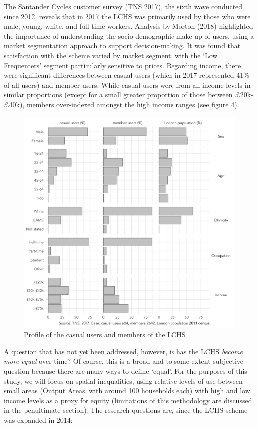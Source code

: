 \documentclass[
]{article}
\begin{document}
The Santander Cycles customer survey (TNS 2017), the sixth wave conducted since 2012, reveals that in 2017 the LCHS was primarily used by those who were male, young, white, and full-time workers.
Analysis by Morton (2018) highlighted the importance of understanding the socio-demographic make-up of users, using a market segmentation approach to support decision-making.
It was found that satisfaction with the scheme varied by market segment, with the `Low Frequenters' segment particularly sensitive to prices.
Regarding income, there were significant differences between casual users (which in 2017 represented 41\% of all users) and member users. While casual users were from all income levels in similar proportions (except for a small greater proportion of those between £20k-£40k), members over-indexed amongst the high income ranges (see figure 4).

\begin{figure}

{\centering \includegraphics[width=0.7\linewidth]{figures/profile_users_lchs} 

}

\caption{Profile of the casual users and members of the LCHS}\label{fig:profile-users-lchs}
\end{figure}

A question that has not yet been addressed, however, is has the LCHS \emph{become more equal} over time?
Of course, this is a broad and to some extent subjective question because there are many ways to define `equal'.
For the purposes of this study, we will focus on spatial inequalities, using relative levels of use between small areas (Output Areas, with around 100 households each) with high and low income levels as a proxy for equity (limitations of this methodology are discussed in the penultimate section).
The research questions are, since the LCHS scheme was expanded in 2014:
\end{document}
